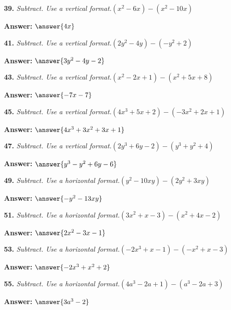 \documentclass{ximera}
\begin{document}
\begin{problem}
\textbf{39.} \emph{Subtract. Use a vertical format.}\quad $(x^2 - 6x) - (x^2 - 10x)$

\textbf{Answer:} $\answer{4x}$
\end{problem}

\begin{problem}
\textbf{41.} \emph{Subtract. Use a vertical format.}\quad $(2y^2 - 4y) - (-y^2 + 2)$

\textbf{Answer:} $\answer{3y^2 -4y -2}$
\end{problem}

\begin{problem}
\textbf{43.} \emph{Subtract. Use a vertical format.}\quad $(x^2 - 2x + 1) - (x^2 + 5x + 8)$

\textbf{Answer:} $\answer{-7x -7}$
\end{problem}

\begin{problem}
\textbf{45.} \emph{Subtract. Use a vertical format.}\quad $(4x^3 + 5x + 2) - (-3x^2 + 2x + 1)$

\textbf{Answer:} $\answer{4x^3 +3x^2 +3x +1}$
\end{problem}

\begin{problem}
\textbf{47.} \emph{Subtract. Use a vertical format.}\quad $(2y^3 + 6y - 2) - (y^3 + y^2 + 4)$

\textbf{Answer:} $\answer{y^3 -y^2 +6y -6}$
\end{problem}

\begin{problem}
\textbf{49.} \emph{Subtract. Use a horizontal format.}\quad $(y^2 - 10xy) - (2y^2 + 3xy)$

\textbf{Answer:} $\answer{-y^2 -13xy}$
\end{problem}

\begin{problem}
\textbf{51.} \emph{Subtract. Use a horizontal format.}\quad $(3x^2 + x - 3) - (x^2 + 4x - 2)$

\textbf{Answer:} $\answer{2x^2 -3x -1}$
\end{problem}

\begin{problem}
\textbf{53.} \emph{Subtract. Use a horizontal format.}\quad $(-2x^3 + x - 1) - (-x^2 + x - 3)$

\textbf{Answer:} $\answer{-2x^3 +x^2 +2}$
\end{problem}

\begin{problem}
\textbf{55.} \emph{Subtract. Use a horizontal format.}\quad $(4a^3 - 2a + 1) - (a^3 - 2a + 3)$

\textbf{Answer:} $\answer{3a^3 -2}$
\end{problem}
\end{document}
